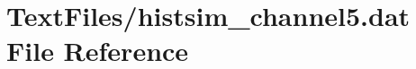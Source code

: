 \hypertarget{TextFiles_2histsim__channel5_8dat}{}\section{Text\+Files/histsim\+\_\+channel5.dat File Reference}
\label{TextFiles_2histsim__channel5_8dat}

